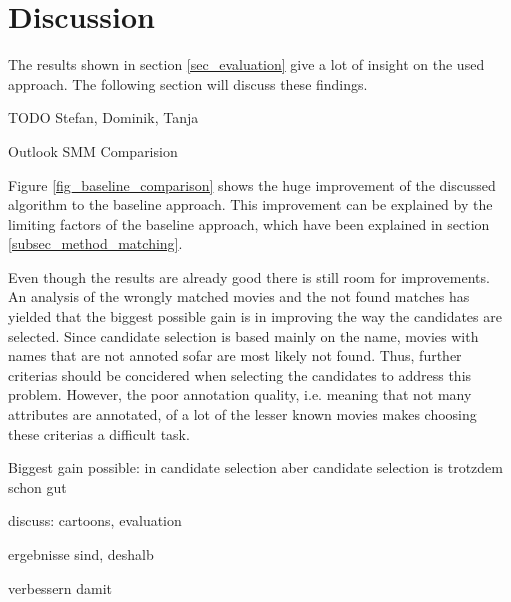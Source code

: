 \section{Discussion}
\label{sec_discussion}

The results shown in section \ref{sec_evaluation} give a lot of insight on the used approach.
The following section will discuss these findings.

TODO Stefan, Dominik, Tanja

Outlook SMM Comparision

Figure \ref{fig_baseline_comparison} shows the huge improvement of the discussed algorithm to the baseline approach.
This improvement can be explained by the limiting factors of the baseline approach, which have been explained in section \ref{subsec_method_matching}.


Even though the results are already good there is still room for improvements.
An analysis of the wrongly matched movies and the not found matches has yielded that the biggest possible gain is in improving the way the candidates are selected.
Since candidate selection is based mainly on the name, movies with names that are not annoted sofar are most likely not found.
Thus, further criterias should be concidered when selecting the candidates to address this problem.
However, the poor annotation quality, i.e. meaning that not many attributes are annotated, of a lot of the lesser known movies makes choosing these criterias a difficult task.


Biggest gain possible: in candidate selection
aber candidate selection is trotzdem schon gut

discuss: cartoons, evaluation

ergebnisse sind, deshalb

verbessern damit

